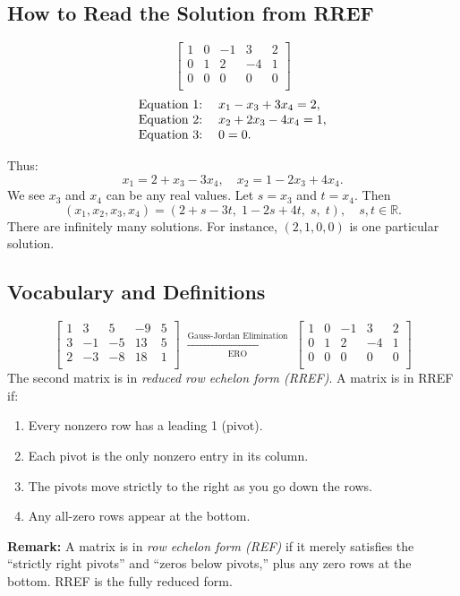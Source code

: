\documentclass[4pt]{article}
\theoremstyle{definition}
\theoremstyle{plain}
\begin{document}
\subsection{How to Read the Solution from RREF}
\[
  \left[\!
    \begin{array}{rrrr|r}
      1 & 0 & -1 & 3  & 2 \\
      0 & 1 & 2  & -4 & 1 \\
      0 & 0 & 0  & 0  & 0 \\
    \end{array}
    \!\right]
\]
\[
  \begin{array}{r@{\;}l}
    \text{Equation 1:} & \quad x_1 - x_3 + 3x_4 = 2,  \\
    \text{Equation 2:} & \quad x_2 + 2x_3 - 4x_4 = 1, \\
    \text{Equation 3:} & \quad 0 = 0.
  \end{array}
\]

Thus:
\[
  x_1 = 2 + x_3 - 3x_4,
  \quad
  x_2 = 1 - 2x_3 + 4x_4.
\]
We see \(x_3\) and \(x_4\) can be any real values. Let \(s = x_3\) and \(t = x_4\). Then
\[
  (x_1, x_2, x_3, x_4)
  =
  (2 + s - 3t,\; 1 - 2s + 4t,\; s,\; t),
  \quad
  s, t \in \mathbb{R}.
\]
There are infinitely many solutions. For instance, \((2,1,0,0)\) is one particular solution.

\subsection{Vocabulary and Definitions}
\[
  \left[\!
    \begin{array}{rrrr|r}
      1 & 3  & 5  & -9 & 5 \\
      3 & -1 & -5 & 13 & 5 \\
      2 & -3 & -8 & 18 & 1 \\
    \end{array}
    \!\right]
  \;\xrightarrow[\text{ERO}]{\text{Gauss-Jordan Elimination}}\;
  \left[\!
    \begin{array}{rrrr|r}
      1 & 0 & -1 & 3  & 2 \\
      0 & 1 & 2  & -4 & 1 \\
      0 & 0 & 0  & 0  & 0 \\
    \end{array}
    \!\right]
\]
The second matrix is in \emph{reduced row echelon form (RREF)}. A matrix is in RREF if:
\begin{enumerate}
  \item Every nonzero row has a leading 1 (pivot).
  \item Each pivot is the only nonzero entry in its column.
  \item The pivots move strictly to the right as you go down the rows.
  \item Any all-zero rows appear at the bottom.
\end{enumerate}
\textbf{Remark:} A matrix is in \emph{row echelon form (REF)} if it merely satisfies the “strictly right pivots” and “zeros below pivots,” plus any zero rows at the bottom. RREF is the fully reduced form.
\end{document}
